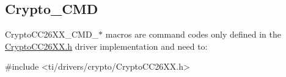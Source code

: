 \subsection{Crypto\+\_\+\+C\+M\+D}
\label{group___crypto___c_m_d}
Crypto\+C\+C26\+X\+X\+\_\+\+C\+M\+D\+\_\+$\ast$ macros are command codes only defined in the \hyperlink{_crypto_c_c26_x_x_8h}{Crypto\+C\+C26\+X\+X.\+h} driver implementation and need to\+: 
\begin{DoxyCode}
\textcolor{preprocessor}{#include <ti/drivers/crypto/CryptoCC26XX.h>}
\end{DoxyCode}
 